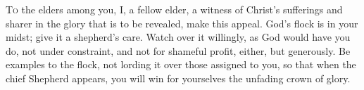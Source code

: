 \lettrine[loversize=0.15,lines=2]{T}{o} the elders among you, I, a fellow elder, a witness of Christ’s sufferings and sharer in the glory that is to be revealed, make this appeal. God’s flock is in your midst; give it a shepherd’s care. Watch over it willingly, as God would have you do, not under constraint, and not for shameful profit, either, but generously. Be examples to the flock, not lording it over those assigned to you, so that when the chief Shepherd appears, you will win for yourselves the unfading crown of glory.
